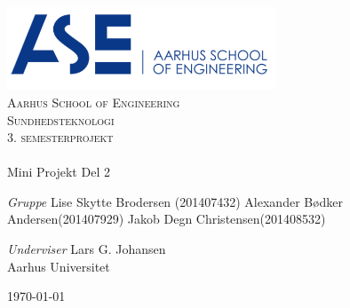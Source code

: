 \begin{titlingpage}
\begin{center}

~ \\[3cm]


\includegraphics[width=0.6\textwidth]{Figurer/ASE}\\[1cm]

\textsc{\LARGE Aarhus School of Engineering}\\[1.5cm]

\textsc{\Large Sundhedsteknologi}\\
\textsc{\Large 3. semesterprojekt}\\[0.5cm]

\noindent\makebox[\linewidth]{\rule{\textwidth}{0.4pt}}\\
[0.5cm]{\Huge Mini Projekt Del 2}
\noindent\makebox[\linewidth]{\rule{\textwidth}{0.4pt}}

\end{center}

\textit{Gruppe} \newline
Lise Skytte Brodersen (201407432) \newline
Alexander Bødker Andersen(201407929) \newline
Jakob Degn Christensen(201408532) \newline




\textit{Underviser} \newline
Lars G. Johansen\\
Aarhus Universitet


\vfill

\begin{center}
{\large \today}
\end{center}


\end{titlingpage}